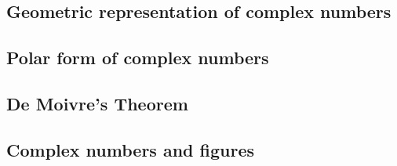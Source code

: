 \subsection{Geometric representation of complex numbers}
\subsection{Polar form of complex numbers}
\subsection{De Moivre's Theorem}
\subsection{Complex numbers and figures}
